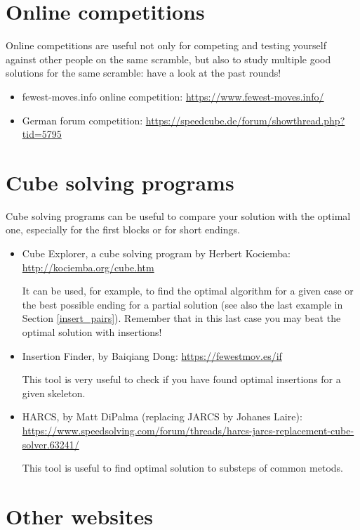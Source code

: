 \documentclass[11pt,a4paper]{book}
\begin{document}
\section*{Online competitions}

Online competitions are useful not only for competing and testing yourself against other people on the same scramble, but also to study multiple good solutions for the same scramble: have a look at the past rounds!

\begin{itemize}
\item fewest-moves.info online competition: \url{https://www.fewest-moves.info/}
\item German forum competition: \url{https://speedcube.de/forum/showthread.php?tid=5795}
\end{itemize}

\section*{Cube solving programs}

Cube solving programs can be useful to compare your solution with the optimal one, especially for the first blocks or for short endings.

\begin{itemize}
\item Cube Explorer, a cube solving program by Herbert Kociemba: \url{http://kociemba.org/cube.htm}

It can be used, for example, to find the optimal algorithm for a given case or the best possible ending for a partial solution (see also the last example in Section \ref{insert_pairs}). Remember that in this last case you may beat the optimal solution with insertions!
\item Insertion Finder, by Baiqiang Dong: \url{https://fewestmov.es/if}

This tool is very useful to check if you have found optimal insertions for a given skeleton.
\item HARCS, by Matt DiPalma (replacing JARCS by Johanes Laire):\\ \url{https://www.speedsolving.com/forum/threads/harcs-jarcs-replacement-cube-solver.63241/}

This tool is useful to find optimal solution to substeps of common metods.
\end{itemize}

\section*{Other websites}
\end{document}
